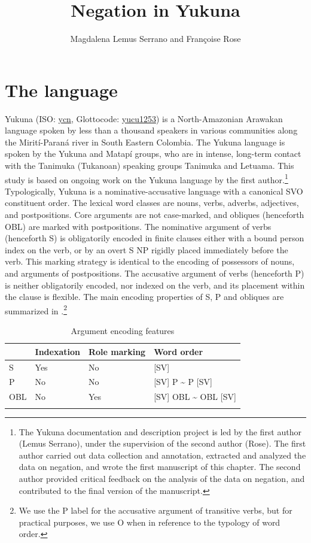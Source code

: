 \documentclass[output=paper,colorlinks,citecolor=brown]{langscibook}
\author{Magdalena Lemus Serrano\affiliation{Dynamique du Langage (CNRS/Université Lyon 2)} and Françoise Rose\affiliation{Dynamique du Langage (CNRS/Université Lyon 2)}}
\title{Negation in Yukuna}
\begin{document}
\maketitle
\section{The language}
Yukuna (ISO: \href{https://iso639-3.sil.org/code/ycn}{ycn}, Glottocode: \href{https://glottolog.org/resource/languoid/id/yucu1253}{yucu1253}) is a North-Amazonian Arawakan language spoken by less than a thousand speakers in various communities along the Mirití-Paraná river in South Eastern Colombia. The Yukuna language is spoken by the Yukuna and Matapí groups, who are in intense, long-term contact with the Tanimuka (Tukanoan) speaking groups Tanimuka and Letuama.  This study is based on ongoing work on the Yukuna language by the first author.\footnote{The Yukuna documentation and description project is led by the first author (Lemus Serrano), under the supervision of the second author (Rose). The first author carried out data collection and annotation, extracted and analyzed the data on negation, and wrote the first manuscript of this chapter. The second author provided critical feedback on the analysis of the data on negation, and contributed to the final version of the manuscript.}
Typologically, Yukuna is a nominative-accusative language with a canonical SVO constituent order. The lexical word classes are nouns, verbs, adverbs, adjectives, and postpositions. Core arguments are not case-marked, and obliques (henceforth OBL) are marked with postpositions. The nominative argument of verbs (henceforth S) is obligatorily encoded in finite clauses either with a bound person index on the verb, or by an overt S NP rigidly placed immediately before the verb. This marking strategy is identical to the encoding of possessors of nouns, and arguments of postpositions. The accusative argument of verbs (henceforth P) is neither obligatorily encoded, nor indexed on the verb, and its placement within the clause is flexible. The main encoding properties of S, P and obliques are summarized in .\footnote{We use the P label for the accusative argument of transitive verbs, but for practical purposes, we use O when in reference to the typology of word order.}

\begin{table}
\caption{Argument encoding features}
\label{yukuna:tableArgEnc}
 \begin{tabular}{llll} 
 \lsptoprule									
		&	Indexation	&	Role marking	&	Word order	\\
\midrule									
S	&		Yes &	No	&	[SV]	\\
P	&		No	&	No	&	[SV] P {\textasciitilde}  P [SV]	\\
OBL	&		No	&	Yes	&	[SV] OBL {\textasciitilde}  OBL [SV]\\
\lspbottomrule									
 \end{tabular}
\end{table}
\end{document}

